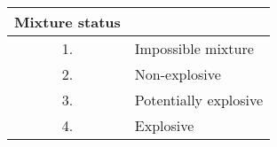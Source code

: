 \begin{tabular}[12pt]{ |c|l| }
  \hline
  \textbf{Mixture status} & \\ \hline
  1. & Impossible mixture \\ \hline
  2. & Non-explosive \\ \hline
  3. & Potentially explosive \\ \hline
  4. & Explosive \\ \hline
\end{tabular}
